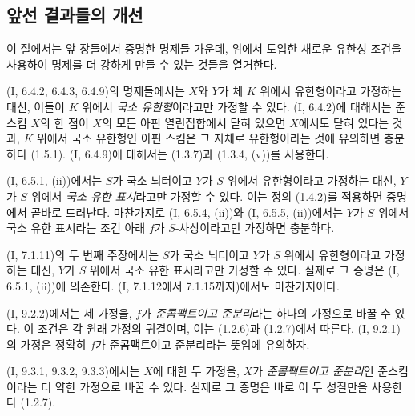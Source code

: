 \subsection{앞선 결과들의 개선}
\label{subsection:IV.1.7-fr}

이 절에서는 앞 장들에서 증명한 명제들 가운데, 위에서 도입한 새로운
유한성 조건을 사용하여 명제를 더 강하게 만들 수 있는 것들을
열거한다.

\begin{env}[1.7.1]
\label{IV.1.7.1-fr}
(I, 6.4.2, 6.4.3, 6.4.9)의 명제들에서는 $X$와 $Y$가 체 $K$ 위에서
유한형이라고 가정하는 대신, 이들이 $K$ 위에서 \emph{국소
유한형}이라고만 가정할 수 있다. (I, 6.4.2)에 대해서는 준스킴 $X$의
한 점이 $X$의 모든 아핀 열린집합에서 닫혀 있으면 $X$에서도 닫혀
있다는 것과, $K$ 위에서 국소 유한형인 아핀 스킴은 그 자체로
유한형이라는 것에 유의하면 충분하다 (1.5.1). (I, 6.4.9)에 대해서는
(1.3.7)과 (1.3.4, (v))를 사용한다.
\end{env}

\begin{env}[1.7.2]
\label{IV.1.7.2-fr}
(I, 6.5.1, (ii))에서는 $S$가 국소 뇌터이고 $Y$가 $S$ 위에서
유한형이라고 가정하는 대신, $Y$가 $S$ 위에서 \emph{국소 유한
표시}라고만 가정할 수 있다. 이는 정의 (1.4.2)를 적용하면 증명에서
곧바로 드러난다. 마찬가지로 (I, 6.5.4, (ii))와 (I, 6.5.5, (ii))에서는
$Y$가 $S$ 위에서 국소 유한 표시라는 조건 아래 $f$가 $S$-사상이라고만
가정하면 충분하다.
\end{env}

\begin{env}[1.7.3]
\label{IV.1.7.3-fr}
(I, 7.1.11)의 두 번째 주장에서는 $S$가 국소 뇌터이고 $Y$가 $S$
위에서 유한형이라고 가정하는 대신, $Y$가 $S$ 위에서 국소 유한
표시라고만 가정할 수 있다. 실제로 그 증명은 (I, 6.5.1, (ii))에
의존한다. (I, 7.1.12에서 7.1.15까지)에서도 마찬가지이다.
\end{env}

\begin{env}[1.7.4]
\label{IV.1.7.4-fr}
(I, 9.2.2)에서는 세 가정을, $f$가 \emph{준콤팩트이고 준분리}라는
하나의 가정으로 바꿀 수 있다. 이 조건은 각 원래 가정의 귀결이며,
이는 (1.2.6)과 (1.2.7)에서 따른다. (I, 9.2.1)의 가정은 정확히
$f$가 준콤팩트이고 준분리라는 뜻임에 유의하자.
\end{env}

\begin{env}[1.7.5]
\label{IV.1.7.5-fr}
(I, 9.3.1, 9.3.2, 9.3.3)에서는 $X$에 대한 두 가정을, $X$가
\emph{준콤팩트이고 준분리}인 준스킴이라는 더 약한 가정으로 바꿀
수 있다. 실제로 그 증명은 바로 이 두 성질만을 사용한다 (1.2.7).
\end{env}

